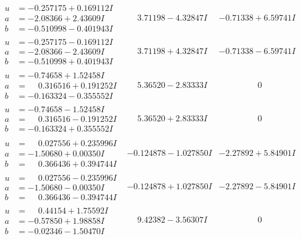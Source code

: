 \documentclass[1p]{elsarticle_modified}
\theoremstyle{definition}
\begin{document}
$$\begin{array}{c|c|c}
\begin{aligned}
u &= -0.257175 + 0.169112 I \\
a &= -2.08366 + 2.43609 I \\
b &= -0.510998 - 0.401943 I\end{aligned}
 & \phantom{-}3.71198 - 4.32847 I & -0.71338 + 6.59741 I \\ \hline\begin{aligned}
u &= -0.257175 - 0.169112 I \\
a &= -2.08366 - 2.43609 I \\
b &= -0.510998 + 0.401943 I\end{aligned}
 & \phantom{-}3.71198 + 4.32847 I & -0.71338 - 6.59741 I \\ \hline\begin{aligned}
u &= -0.74658 + 1.52458 I \\
a &= \phantom{-}0.316516 + 0.191252 I \\
b &= -0.163324 - 0.355552 I\end{aligned}
 & \phantom{-}5.36520 - 2.83333 I & \phantom{-0.000000 } 0 \\ \hline\begin{aligned}
u &= -0.74658 - 1.52458 I \\
a &= \phantom{-}0.316516 - 0.191252 I \\
b &= -0.163324 + 0.355552 I\end{aligned}
 & \phantom{-}5.36520 + 2.83333 I & \phantom{-0.000000 } 0 \\ \hline\begin{aligned}
u &= \phantom{-}0.027556 + 0.235996 I \\
a &= -1.50680 + 0.00350 I \\
b &= \phantom{-}0.366436 + 0.394744 I\end{aligned}
 & -0.124878 - 1.027850 I & -2.27892 + 5.84901 I \\ \hline\begin{aligned}
u &= \phantom{-}0.027556 - 0.235996 I \\
a &= -1.50680 - 0.00350 I \\
b &= \phantom{-}0.366436 - 0.394744 I\end{aligned}
 & -0.124878 + 1.027850 I & -2.27892 - 5.84901 I \\ \hline\begin{aligned}
u &= \phantom{-}0.44154 + 1.75592 I \\
a &= -0.57850 + 1.98858 I \\
b &= -0.02346 - 1.50470 I\end{aligned}
 & \phantom{-}9.42382 - 3.56307 I & \phantom{-0.000000 } 0 \\ \hline\begin{aligned}

\end{aligned}
\end{array}$$
\end{document}
